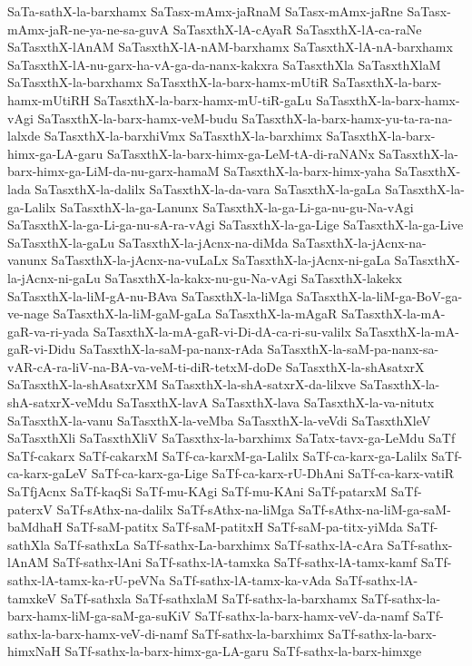 {SaTa-sathX-la-barxhamx
SaTasx-mAmx-jaRnaM
SaTasx-mAmx-jaRne
SaTasx-mAmx-jaR-ne-ya-ne-sa-guvA
SaTasxthX-lA-cAyaR
SaTasxthX-lA-ca-raNe
SaTasxthX-lAnAM
SaTasxthX-lA-nAM-barxhamx
SaTasxthX-lA-nA-barxhamx
SaTasxthX-lA-nu-garx-ha-vA-ga-da-nanx-kakxra
SaTasxthXla
SaTasxthXlaM
SaTasxthX-la-barxhamx
SaTasxthX-la-barx-hamx-mUtiR
SaTasxthX-la-barx-hamx-mUtiRH
SaTasxthX-la-barx-hamx-mU-tiR-gaLu
SaTasxthX-la-barx-hamx-vAgi
SaTasxthX-la-barx-hamx-veM-budu
SaTasxthX-la-barx-hamx-yu-ta-ra-na-lalxde
SaTasxthX-la-barxhiVmx
SaTasxthX-la-barxhimx
SaTasxthX-la-barx-himx-ga-LA-garu
SaTasxthX-la-barx-himx-ga-LeM-tA-di-raNANx
SaTasxthX-la-barx-himx-ga-LiM-da-nu-garx-hamaM
SaTasxthX-la-barx-himx-yaha
SaTasxthX-lada
SaTasxthX-la-dalilx
SaTasxthX-la-da-vara
SaTasxthX-la-gaLa
SaTasxthX-la-ga-Lalilx
SaTasxthX-la-ga-Lanunx
SaTasxthX-la-ga-Li-ga-nu-gu-Na-vAgi
SaTasxthX-la-ga-Li-ga-nu-sA-ra-vAgi
SaTasxthX-la-ga-Lige
SaTasxthX-la-ga-Live
SaTasxthX-la-gaLu
SaTasxthX-la-jAcnx-na-diMda
SaTasxthX-la-jAcnx-na-vanunx
SaTasxthX-la-jAcnx-na-vuLaLx
SaTasxthX-la-jAcnx-ni-gaLa
SaTasxthX-la-jAcnx-ni-gaLu
SaTasxthX-la-kakx-nu-gu-Na-vAgi
SaTasxthX-lakekx
SaTasxthX-la-liM-gA-nu-BAva
SaTasxthX-la-liMga
SaTasxthX-la-liM-ga-BoV-ga-ve-nage
SaTasxthX-la-liM-gaM-gaLa
SaTasxthX-la-mAgaR
SaTasxthX-la-mA-gaR-va-ri-yada
SaTasxthX-la-mA-gaR-vi-Di-dA-ca-ri-su-valilx
SaTasxthX-la-mA-gaR-vi-Didu
SaTasxthX-la-saM-pa-nanx-rAda
SaTasxthX-la-saM-pa-nanx-sa-vAR-cA-ra-liV-na-BA-va-veM-ti-diR-tetxM-doDe
SaTasxthX-la-shAsatxrX
SaTasxthX-la-shAsatxrXM
SaTasxthX-la-shA-satxrX-da-lilxve
SaTasxthX-la-shA-satxrX-veMdu
SaTasxthX-lavA
SaTasxthX-lava
SaTasxthX-la-va-nitutx
SaTasxthX-la-vanu
SaTasxthX-la-veMba
SaTasxthX-la-veVdi
SaTasxthXleV
SaTasxthXli
SaTasxthXliV
SaTasxthx-la-barxhimx
SaTatx-tavx-ga-LeMdu
SaTf
SaTf-cakarx
SaTf-cakarxM
SaTf-ca-karxM-ga-Lalilx
SaTf-ca-karx-ga-Lalilx
SaTf-ca-karx-gaLeV
SaTf-ca-karx-ga-Lige
SaTf-ca-karx-rU-DhAni
SaTf-ca-karx-vatiR
SaTfjAcnx
SaTf-kaqSi
SaTf-mu-KAgi
SaTf-mu-KAni
SaTf-patarxM
SaTf-paterxV
SaTf-sAthx-na-dalilx
SaTf-sAthx-na-liMga
SaTf-sAthx-na-liM-ga-saM-baMdhaH
SaTf-saM-patitx
SaTf-saM-patitxH
SaTf-saM-pa-titx-yiMda
SaTf-sathXla
SaTf-sathxLa
SaTf-sathx-La-barxhimx
SaTf-sathx-lA-cAra
SaTf-sathx-lAnAM
SaTf-sathx-lAni
SaTf-sathx-lA-tamxka
SaTf-sathx-lA-tamx-kamf
SaTf-sathx-lA-tamx-ka-rU-peVNa
SaTf-sathx-lA-tamx-ka-vAda
SaTf-sathx-lA-tamxkeV
SaTf-sathxla
SaTf-sathxlaM
SaTf-sathx-la-barxhamx
SaTf-sathx-la-barx-hamx-liM-ga-saM-ga-suKiV
SaTf-sathx-la-barx-hamx-veV-da-namf
SaTf-sathx-la-barx-hamx-veV-di-namf
SaTf-sathx-la-barxhimx
SaTf-sathx-la-barx-himxNaH
SaTf-sathx-la-barx-himx-ga-LA-garu
SaTf-sathx-la-barx-himxge
}
